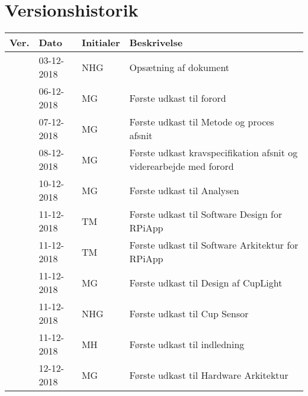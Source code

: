 \documentclass[Rapport/Rapport_main.tex]{subfiles}
\begin{document}
\section{Versionshistorik}
\begin{longtable}{|L{0.07\textwidth}|L{0.15\textwidth}|L{0.13\textwidth}|L{0.55\textwidth}|}
        \hline
        \textbf{Ver.} & \textbf{Dato} & \textbf{Initialer} & \textbf{Beskrivelse}  \\ \hline
        & 03-12-2018 & NHG & Opsætning af dokument \\ \hline
        & 06-12-2018 & MG & Første udkast til forord \\ \hline
        & 07-12-2018 & MG & Første udkast til Metode og proces afsnit \\ \hline
        & 08-12-2018 & MG & Første udkast kravspecifikation afsnit og viderearbejde med forord \\ \hline
        & 10-12-2018 & MG & Første udkast til Analysen \\ \hline
        & 11-12-2018 & TM & Første udkast til Software Design for RPiApp \\ \hline
        & 11-12-2018 & TM & Første udkast til Software Arkitektur for RPiApp \\ \hline 
        & 11-12-2018 & MG & Første udkast til Design af CupLight \\ \hline 
        & 11-12-2018 & NHG & Første udkast til Cup Sensor \\ \hline
        & 11-12-2018 & MH & Første udkast til indledning \\ \hline
        & 12-12-2018 & MG & Første udkast til Hardware Arkitektur \\ \hline
\end{longtable}
\end{document}
